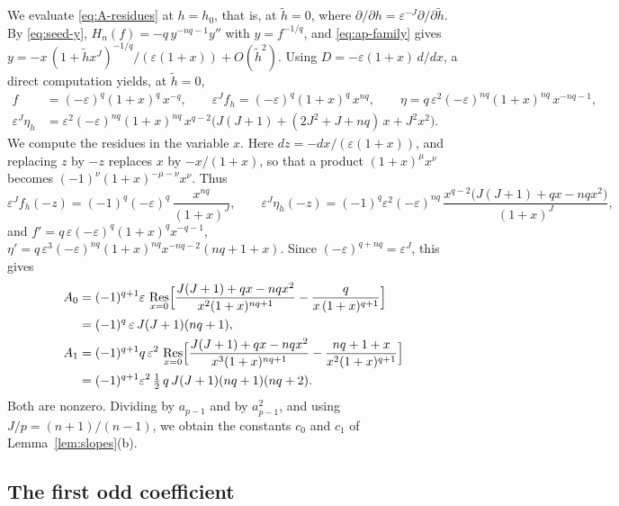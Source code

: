 \documentclass[11pt]{article}
\theoremstyle{definition}
\theoremstyle{remark}
\numberwithin{equation}{section}
\DeclareMathOperator{\Res}{Res}
\begin{document}
We evaluate \eqref{eq:A-residues} at \(h=h_0\), that is, at
\(\tilde h=0\), where
\(\partial/\partial h=\varepsilon^{-J}\partial/\partial\tilde h\). By
\eqref{eq:seed-y}, \(H_n(f)=-q\,y^{-nq-1}y''\) with \(y=f^{-1/q}\), and
\eqref{eq:ap-family} gives
\(y=-x\,(1+\tilde hx^J)^{-1/q}/(\varepsilon(1+x))+O(\tilde h^2)\). Using
\(D=-\varepsilon(1+x)\,d/dx\), a direct computation yields, at
\(\tilde h=0\),
\begin{equation}\label{eq:ap-data}
\begin{aligned}
 f&=(-\varepsilon)^q(1+x)^q\,x^{-q}, \qquad
 \varepsilon^Jf_h=(-\varepsilon)^q(1+x)^q\,x^{nq},\qquad
 \eta=q\,\varepsilon^2(-\varepsilon)^{nq}(1+x)^{nq}\,x^{-nq-1},\\
 \varepsilon^J\eta_h&=\varepsilon^2(-\varepsilon)^{nq}(1+x)^{nq}\,x^{q-2}
 \bigl(J(J+1)+(2J^2+J+nq)\,x+J^2x^2\bigr).
\end{aligned}
\end{equation}
We compute the residues in the variable \(x\). Here
\(dz=-dx/(\varepsilon(1+x))\), and replacing \(z\) by \(-z\) replaces
\(x\) by \(-x/(1+x)\), so that a product \((1+x)^\mu x^\nu\)
becomes \((-1)^\nu(1+x)^{-\mu-\nu}x^\nu\). Thus
\[
 \varepsilon^Jf_h(-z)=(-1)^q(-\varepsilon)^q\,\frac{x^{nq}}{(1+x)^{J}},\qquad
 \varepsilon^J\eta_h(-z)=(-1)^q\varepsilon^2(-\varepsilon)^{nq}\,
 \frac{x^{q-2}\bigl(J(J+1)+qx-nqx^2\bigr)}{(1+x)^{J}},
\]
and \(f'=q\,\varepsilon(-\varepsilon)^q(1+x)^qx^{-q-1}\),
\(\eta'=q\,\varepsilon^3(-\varepsilon)^{nq}(1+x)^{nq}x^{-nq-2}(nq+1+x)\).
Since \((-\varepsilon)^{q+nq}=\varepsilon^J\), this gives
\begin{align*}
 A_0&=(-1)^{q+1}\varepsilon\,\Res_{x=0}
 \Bigl[\frac{J(J+1)+qx-nqx^2}{x^{2}(1+x)^{nq+1}}
 -\frac{q}{x\,(1+x)^{q+1}}\Bigr]\\
 &=(-1)^q\,\varepsilon\,J(J+1)(nq+1),\\
 A_1&=(-1)^{q+1}q\,\varepsilon^2\,\Res_{x=0}
 \Bigl[\frac{J(J+1)+qx-nqx^2}{x^{3}(1+x)^{nq+1}}
 -\frac{nq+1+x}{x^{2}(1+x)^{q+1}}\Bigr]\\
 &=(-1)^{q+1}\varepsilon^2\,\tfrac12\,q\,J(J+1)(nq+1)(nq+2).
\end{align*}
Both are nonzero. Dividing by \(a_{p-1}\) and by \(a_{p-1}^2\), and
using \(J/p=(n+1)/(n-1)\), we obtain the constants \(c_0\) and \(c_1\)
of Lemma~\ref{lem:slopes}(b).

\subsection{The first odd coefficient}
\end{document}
